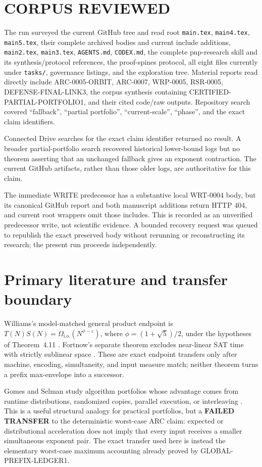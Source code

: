 \documentclass[11pt]{article}
\begin{document}
\section{CORPUS REVIEWED}
The run surveyed the current GitHub tree and read root \texttt{main.tex},
\texttt{main4.tex}, \texttt{main5.tex}, their complete archived bodies and
current include additions, \texttt{main2.tex}, \texttt{main3.tex},
\texttt{AGENTS.md}, \texttt{CODEX.md}, the complete pnp-research skill and
its synthesis/protocol references, the proof-spines protocol, all eight files
currently under \texttt{tasks/}, governance listings, and the exploration
tree.  Material reports read directly include ARC-0005-ORBIT, ARC-0007,
WRP-0005, RSR-0005, DEFENSE-FINAL-LINK3, the corpus synthesis containing
CERTIFIED-PARTIAL-PORTFOLIO1, and their cited code/raw outputs.  Repository
search covered ``fallback'', ``partial portfolio'', ``current-scale'',
``phase'', and the exact claim identifiers.

Connected Drive searches for the exact claim identifier returned no result.
A broader partial-portfolio search recovered historical lower-bound logs but
no theorem asserting that an unchanged fallback gives an exponent
contraction.  The current GitHub artifacts, rather than those older logs, are
authoritative for this claim.

The immediate WRITE predecessor has a substantive local WRT-0004 body, but
its canonical GitHub report and both manuscript additions return HTTP 404,
and current root wrappers omit those includes.  This is recorded as an
unverified predecessor write, not scientific evidence.  A bounded recovery
request was queued to republish the exact preserved body without rerunning or
reconstructing its research; the present run proceeds independently.

\section{Primary literature and transfer boundary}
Williams's model-matched general product endpoint is
\(T(N)S(N)=\Omega_{\mathrm{i.o.}}(N^{\phi-\varepsilon})\), where
\(\phi=(1+\sqrt5)/2\), under the hypotheses of Theorem~4.11
\cite{williams2010}.  Fortnow's separate theorem excludes near-linear SAT
time with strictly sublinear space \cite{fortnow2000}.  These are exact
endpoint transfers only after machine, encoding, simultaneity, and input
measure match; neither theorem turns a prefix max-envelope into a successor.

Gomes and Selman study algorithm portfolios whose advantage comes from
runtime distributions, randomized copies, parallel execution, or
interleaving \cite{arc0008GomesSelman}.  This is a useful structural analogy
for practical portfolios, but a \textbf{FAILED TRANSFER} to the deterministic
worst-case ARC claim: expected or distributional acceleration does not imply
that every input receives a smaller simultaneous exponent pair.  The exact
transfer used here is instead the elementary worst-case maximum accounting
already proved by GLOBAL-PREFIX-LEDGER1.
\end{document}
